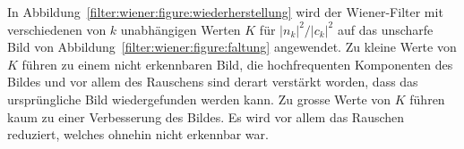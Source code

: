 In Abbildung~\ref{filter:wiener:figure:wiederherstellung}
wird der Wiener-Filter mit verschiedenen von $k$ unabhängigen Werten
$K$ für $|n_k|^2/|c_k|^2$ auf das unscharfe Bild von
Abbildung~\ref{filter:wiener:figure:faltung} angewendet.
Zu kleine Werte von $K$ führen zu einem nicht erkennbaren Bild, die
hochfrequenten Komponenten des Bildes und vor allem des Rauschens
sind derart verstärkt worden, dass das ursprüngliche Bild wiedergefunden
werden kann.
Zu grosse Werte von $K$ führen kaum zu einer Verbesserung des Bildes.
Es wird vor allem das Rauschen reduziert, welches ohnehin nicht
erkennbar war.









